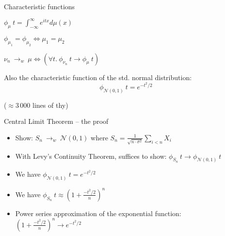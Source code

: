 \documentclass[usepdftitle=false]{beamer}
\begin{document}
\begin{frame}{Characteristic functions} %

\begin{definition}%
\vspace{-1em}
\begin{center} $ \displaystyle \phi_\mu~t = \int_{-\infty}^{\infty} e^{itx} d\mu(x) $ \end{center}
\end{definition}

\pause

\begin{theorem}
\vspace{-1em}
\begin{center} $ \phi_{\mu_1} = \phi_{\mu_2} \Leftrightarrow \mu_1 = \mu_2 $ \end{center} 
\end{theorem}

\pause

\begin{theorem}
\vspace{-1em}
\begin{center} $ \nu_n ~{\longrightarrow}_w~ \mu \Leftrightarrow
  (\forall t.\ \phi_{\nu_n}~t \longrightarrow \phi_\mu~t) $ \end{center}
\end{theorem}

\pause

Also the characteristic function of the std. normal distribution:
\[ \phi_{\mathcal{N}(0, 1)}~t = e^{-t^2/2}\]

($\approx 3\,000$ lines of thy)
\end{frame} %

\begin{frame}{Central Limit Theorem -- the proof} %
\begin{itemize}[<+->]

  \item Show: $S_n ~{\longrightarrow}_w~ \mathcal{N}(0, 1)$ where $S_n = \frac{1}{\sqrt{n\cdot \sigma^2}} \sum_{i < n} X_i$

  \item With Levy's Continuity Theorem, suffices to show:
    $\phi_{S_n}~t \longrightarrow \phi_{\mathcal{N}(0, 1)}~t$
    
  \item We have $\phi_{\mathcal{N}(0, 1)}~t = e^{-t^2/2}$
  
  \item We have $\phi_{S_n}~t \approx
    (1 + \frac{- t^2 / 2}{n})^n$
  
  \item Power series approximation of the exponential function:
    $(1 + \frac{- t^2 / 2}{n})^n \longrightarrow e^{-t^2/2}$ \\

\end{itemize}

\end{frame} %
\end{document}
